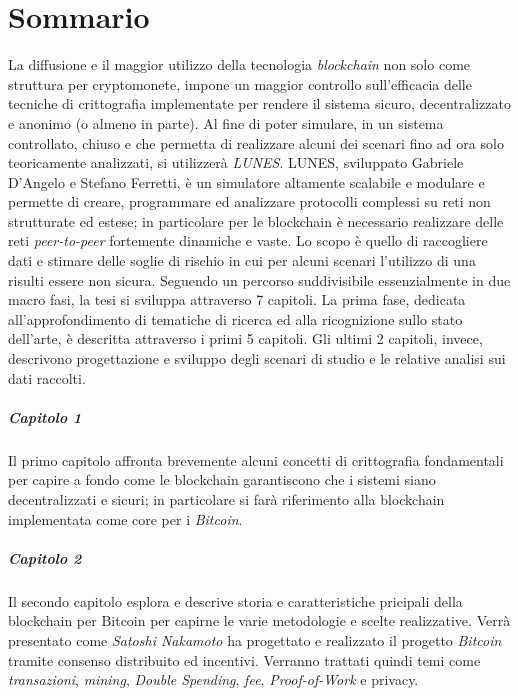 \chapter*{Sommario}
La diffusione e il maggior utilizzo della tecnologia \textit{blockchain} non solo come struttura per cryptomonete, impone un maggior controllo sull'efficacia delle tecniche di crittografia implementate per rendere il sistema sicuro, decentralizzato e anonimo (o almeno in parte).\newline
Al fine di poter simulare, in un sistema controllato, chiuso e che permetta di realizzare alcuni dei scenari fino ad ora solo teoricamente analizzati, si utilizzerà \textit{LUNES}\cite{gdalunes}.\newline
LUNES, sviluppato Gabriele D'Angelo e Stefano Ferretti, è un simulatore altamente scalabile e modulare e permette di creare, programmare ed analizzare protocolli complessi su reti non strutturate ed estese; in particolare per le blockchain è necessario realizzare delle reti \textit{peer-to-peer} fortemente dinamiche e vaste.\newline
Lo scopo è quello di raccogliere dati e stimare delle soglie di rischio in cui per alcuni scenari l'utilizzo di una  risulti essere non sicura.\newline\newline
Seguendo un percorso suddivisibile essenzialmente in due macro fasi, la tesi si sviluppa attraverso 7 capitoli. La prima fase, dedicata all'approfondimento di tematiche di ricerca ed alla ricognizione sullo stato dell'arte, è descritta attraverso i primi 5 capitoli. Gli ultimi 2 capitoli, invece, descrivono progettazione e sviluppo degli scenari di studio e le relative analisi sui dati raccolti.

\paragraph{Capitolo 1}
Il primo capitolo affronta brevemente alcuni concetti di crittografia fondamentali per capire a fondo come le blockchain garantiscono che i sistemi siano decentralizzati e sicuri; in particolare si farà riferimento alla blockchain implementata come core per i \textit{Bitcoin}.

\paragraph{Capitolo 2}
Il secondo capitolo esplora e descrive storia e caratteristiche pricipali della blockchain per Bitcoin per capirne le varie metodologie e scelte realizzative. Verrà presentato come \textit{Satoshi Nakamoto} ha progettato e realizzato il progetto \textit{Bitcoin} tramite consenso distribuito ed incentivi. Verranno trattati quindi temi come \textit{transazioni}, \textit{mining}, \textit{Double Spending}, \textit{fee}, \textit{Proof-of-Work} e privacy.

